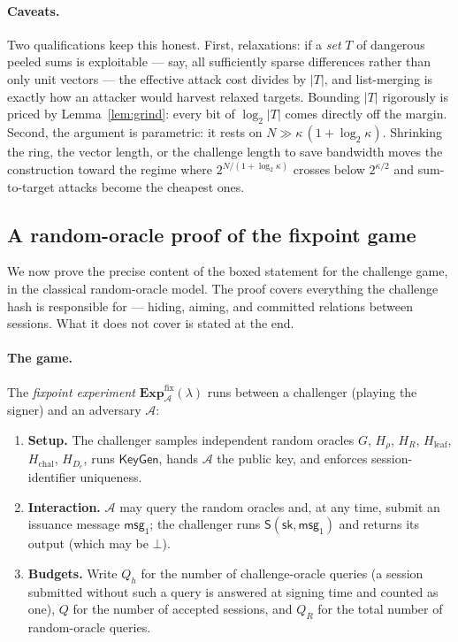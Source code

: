 \documentclass[11pt]{article}
\newcommand{\Exp}{\mathbf{Exp}}
\renewcommand{\S}{\mathsf{S}}
\begin{document}
\paragraph{Caveats.}
Two qualifications keep this honest.  First, relaxations: if a \emph{set} $T$
of dangerous peeled sums is exploitable --- say, all sufficiently sparse
differences rather than only unit vectors --- the effective attack cost
divides by $|T|$, and list-merging is exactly how an attacker would harvest
relaxed targets.  Bounding $|T|$ rigorously is priced by
Lemma~\ref{lem:grind}: every bit of $\log_2|T|$ comes directly off the
margin.  Second, the argument is parametric: it rests on
$N\gg\kappa\,(1+\log_2\kappa)$.  Shrinking the ring, the vector length, or
the challenge length to save bandwidth moves the construction toward the
regime where $2^{N/(1+\log_2\kappa)}$ crosses below $2^{\kappa/2}$ and
sum-to-target attacks become the cheapest ones.

\subsection{A random-oracle proof of the fixpoint game}
\label{sec:romproof}

We now prove the precise content of the boxed statement for the challenge
game, in the classical random-oracle model.  The proof covers everything the
challenge hash is responsible for --- hiding, aiming, and committed relations
between sessions.  What it does not cover is stated at the end.

\paragraph{The game.}
The \emph{fixpoint experiment} $\Exp^{\mathrm{fix}}_{\mathcal A}(\lambda)$
runs between a challenger (playing the signer) and an adversary $\mathcal A$:
\begin{enumerate}
 \item \textbf{Setup.}  The challenger samples independent random oracles
$G$, $H_\rho$, $H_R$, $H_{\mathrm{leaf}}$, $H_{\mathrm{chal}}$, $H_{D_e}$,
runs $\mathsf{KeyGen}$, hands $\mathcal A$ the public key, and enforces
session-identifier uniqueness.
 \item \textbf{Interaction.}  $\mathcal A$ may query the random oracles and,
at any time, submit an issuance message $\mathsf{msg}_1$; the challenger runs
$\S(\mathsf{sk},\mathsf{msg}_1)$ and returns its output (which may be
$\bot$).
 \item \textbf{Budgets.}  Write $Q_h$ for the number of challenge-oracle
queries (a session submitted without such a query is answered at signing time
and counted as one), $Q$ for the number of accepted sessions, and $Q_R$ for
the total number of random-oracle queries.
\end{enumerate}
\end{document}

